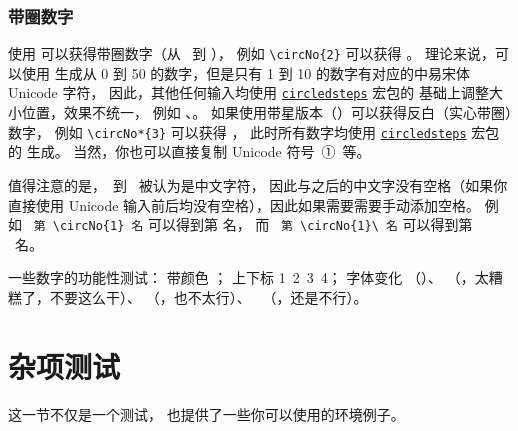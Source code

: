 \subsubsection{带圈数字}
使用 \texttt{\string\circNo} 可以获得带圈数字（从 \ 到 ），
例如 \verb|\circNo{2}| 可以获得 。
理论来说，可以使用 \texttt{\string\circNo} 生成从 0 到 50 的数字，但是只有 1 到 10 的数字有对应的中易宋体 Unicode 字符，
因此，其他任何输入均使用 \href{https://ctan.org/pkg/circledsteps}{\texttt{circledsteps}} 宏包的 \texttt{\string\CircleText} 基础上调整大小位置，效果不统一，
例如 、。
如果使用带星版本（\texttt{\string\circNo*}）可以获得反白（实心带圈）数字，
例如 \verb|\circNo*{3}| 可以获得 ，
此时所有数字均使用 \href{https://ctan.org/pkg/circledsteps}{\texttt{circledsteps}} 宏包的 \texttt{\string\Circle} 生成。
当然，你也可以直接复制 Unicode 符号\ ①\ 等。

值得注意的是，\ 到 \ 被认为是中文字符，
因此与之后的中文字没有空格（如果你直接使用 Unicode 输入前后均没有空格），因此如果需要需要手动添加空格。
例如 {\color{Blue}\ \verb|第 \circNo{1} 名|} 可以得到第  名，
而 {\color{Blue}\ \verb|第 \circNo{1}\ 名|} 可以得到第 \ 名。

一些数字的功能性测试：
带颜色 \textcolor{red}{     }；
上下标 1\textsuperscript{}\ 2\textsuperscript{}\ 3\textsubscript{}\ 4\textsubscript{}；
字体变化 \textsf{  }（\texttt{\string\ttfamily}）、
\textit{  }（\texttt{\string\itshape}，太糟糕了，不要这么干）、
\textbf{  }（\texttt{\string\bfseries}，也不太行）、
\texttt{  }（\texttt{\string\ttfamily}，还是不行）。

\section{杂项测试}
这一节不仅是一个测试，
也提供了一些你可以使用的环境例子。

